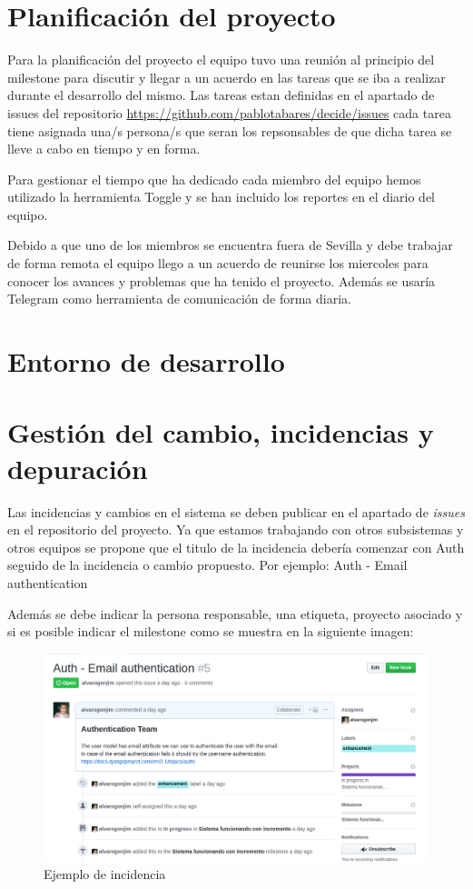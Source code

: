 \documentclass[12pt]{article}
\begin{document}
\section{Planificación del proyecto}
Para la planificación del proyecto el equipo tuvo una reunión al principio del milestone para discutir y llegar a un acuerdo en las tareas que se iba a realizar durante el desarrollo del mismo. Las tareas estan definidas en el apartado de issues del repositorio \url{https://github.com/pablotabares/decide/issues} cada tarea tiene asignada una/s persona/s que seran los repsonsables de que dicha tarea se lleve a cabo en tiempo y en forma. 

Para gestionar el tiempo que ha dedicado cada miembro del equipo hemos utilizado la herramienta Toggle \cite{toggl} y se han incluido los reportes en el diario del equipo. 

Debido a que uno de los miembros se encuentra fuera de Sevilla y debe trabajar de forma remota el equipo llego a un acuerdo de reunirse los miercoles para conocer los avances y problemas que ha tenido el proyecto. Además se usaría Telegram \cite{telegram} como herramienta de comunicación de forma diaria.

\section{Entorno de desarrollo}

\section{Gestión del cambio, incidencias y depuración}

Las incidencias y cambios en el sistema se deben publicar en el apartado de  \emph{issues} en el repositorio del proyecto. Ya que estamos trabajando con otros subsistemas y otros equipos se propone que el titulo de la incidencia debería comenzar con Auth seguido de la incidencia o cambio propuesto. Por ejemplo: Auth - Email authentication \cite{auth-issue}

Además se debe indicar la persona responsable, una etiqueta, proyecto asociado y si es posible indicar el milestone como se muestra en la siguiente imagen:

\begin{figure}[h]
\centering
\includegraphics[width=1\textwidth]{issue-example.png}
\caption{Ejemplo de incidencia}
\end{figure}
\end{document}
